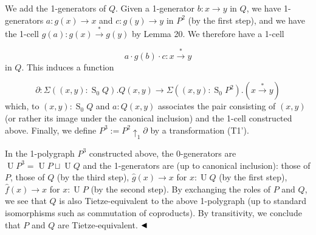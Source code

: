 \documentclass[10pt,a4paper]{amsart}
\begin{document}
We add the 1-generators of $Q$. Given a 1-generator $b:x\to y$ in $Q$, we have 1-generators $a:g(x)\to x$ and $c:g(y)\to y$ in $P^{2}$ (by the first step), and we have the 1-cell $g(a):g(x)\overset{*}{\to}g(y)$ by Lemma 20. We therefore have a 1-cell\par
    \[a\cdot{}g(b)\cdot{}c:x\overset{*}{\to}y\]    
in $Q$. This induces a function\par
    \[\partial:\Sigma((x,y):\operatorname{S}_{0}Q).Q(x,y)\to\Sigma((x,y):\operatorname{S}_{0}P^{2}).(x\overset{*}{\to}y)\]    
which, to $(x,y):\operatorname{S}_{0}Q$ and $a:Q(x,y)$ associates the pair consisting of $(x,y)$ (or rather its image under the canonical inclusion) and the 1-cell constructed above. Finally, we define $P^{3}:=P^{2}{\uparrow_{1}}\partial$ by a transformation (T1’).\par
 
 
  
In the 1-polygraph $P^{3}$ constructed above, the 0-generators are $\operatorname{U}P^{3}=\operatorname{U}P\sqcup\operatorname{U}Q$ and the 1-generators are (up to canonical inclusion): those of $P$, those of $Q$ (by the third step), $\hat{g}(x)\to x$ for $x:\operatorname{U}Q$ (by the first step), $\hat{f}(x)\to x$ for $x:\operatorname{U}P$ (by the second step). By exchanging the roles of $P$ and $Q$, we see that $Q$ is also Tietze-equivalent to the above 1-polygraph (up to standard isomorphisms such as commutation of coproducts). By transitivity, we conclude that $P$ and $Q$ are Tietze-equivalent. $\hfill\blacktriangleleft$\par
 
 
 
\end{document}
